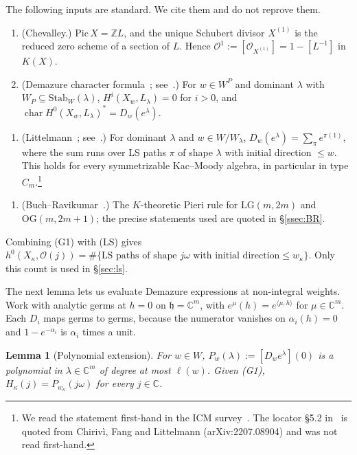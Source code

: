 \documentclass[11pt]{amsart}
\newtheorem{lemma}[theorem]{Lemma}
\theoremstyle{definition}
\theoremstyle{remark}
\newcommand{\LG}{\mathrm{LG}}
\newcommand{\OG}{\mathrm{OG}}
\newcommand{\cO}{\mathcal{O}}
\newcommand{\Z}{\mathbb{Z}}
\newcommand{\C}{\mathbb{C}}
\begin{document}
The following inputs are standard. We cite them and do not reprove them.
\begin{enumerate}[label=(G\arabic*),start=0,leftmargin=*]
\item (Chevalley.) $\mathrm{Pic}\,X=\Z L$, and the unique Schubert divisor $X^{(1)}$ is
the reduced zero scheme of a section of $L$. Hence $\cO^1:=[\cO_{X^{(1)}}]=1-[L^{-1}]$ in
$K(X)$.
\item (Demazure character formula~\cite{Dem74,Jos85,And85,Ram85,Kum87,Mat88};
see~\cite[Ch.~3]{BK05}.) For $w\in W^P$ and dominant $\lambda$ with
$W_P\subseteq\mathrm{Stab}_W(\lambda)$, $H^i(X_w,L_\lambda)=0$ for $i>0$, and
$\operatorname{char}H^0(X_w,L_\lambda)^*=D_w(e^\lambda)$.
\end{enumerate}
\begin{enumerate}[label=(LS),leftmargin=*]
\item (Littelmann~\cite[\S5.2]{Lit94}; see~\cite[\S8, p.~305]{LitICM}.) For dominant
$\lambda$ and $w\in W/W_\lambda$, $D_w(e^\lambda)=\sum_\pi e^{\pi(1)}$, where the sum runs
over LS paths $\pi$ of shape $\lambda$ with initial direction $\le w$. This holds for every
symmetrizable Kac--Moody algebra, in particular in type $C_m$.\footnote{We read the statement
first-hand in the ICM survey~\cite[p.~305]{LitICM}. The locator \S5.2 in~\cite{Lit94} is quoted
from Chirivì, Fang and Littelmann (arXiv:2207.08904) and was not read first-hand.}
\end{enumerate}
\begin{enumerate}[label=(BR),leftmargin=*]
\item (Buch--Ravikumar~\cite{BR12}.) The $K$-theoretic Pieri rule for $\LG(m,2m)$ and
$\OG(m,2m+1)$; the precise statements used are quoted in \S\ref{ssec:BR}.
\end{enumerate}
Combining (G1) with (LS) gives
$h^0(X_\kappa,\cO(j))=\#\{\text{LS paths of shape }j\omega\text{ with initial direction}\le w_\kappa\}$.
Only this count is used in \S\ref{sec:ls}.

The next lemma lets us evaluate Demazure expressions at non-integral weights. Work with
analytic germs at $h=0$ on $\mathfrak h=\C^m$, with $e^\mu(h)=e^{\langle\mu,h\rangle}$ for
$\mu\in\C^m$. Each $D_i$ maps germs to germs, because the numerator vanishes on
$\alpha_i(h)=0$ and $1-e^{-\alpha_i}$ is $\alpha_i$ times a unit.

\begin{lemma}[Polynomial extension]\label{lem:P}
For $w\in W$, $P_w(\lambda):=[D_we^\lambda](0)$ is a polynomial in $\lambda\in\C^m$ of degree
at most $\ell(w)$. Given (G1), $H_\kappa(j)=P_{w_\kappa}(j\omega)$ for every $j\in\C$.
\end{lemma}
\end{document}
